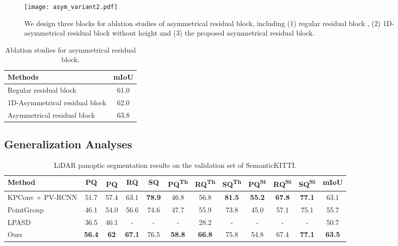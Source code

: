 \documentclass[final]{cvpr}
\newcommand{\PQ}{PQ}
\newcommand{\PQda}{PQ\textsuperscript{}}
\newcommand{\RQ}{RQ}
\newcommand{\SQ}{SQ}
\newcommand{\PQth}{PQ\textsuperscript{Th}}
\newcommand{\RQth}{RQ\textsuperscript{Th}}
\newcommand{\SQth}{SQ\textsuperscript{Th}}
\newcommand{\PQst}{PQ\textsuperscript{St}}
\newcommand{\RQst}{RQ\textsuperscript{St}}
\newcommand{\SQst}{SQ\textsuperscript{St}}
\newcommand{\miou}{mIoU}
\begin{document}
\begin{figure}[t]
    \centering
    \texttt{[image: asym\_variant2.pdf]}
    \caption{We design three blocks for ablation studies of asymmetrical residual block, including (1) regular residual block , (2) 1D-asymmetrical residual block without height and (3) the proposed asymmetrical residual block.}
    \label{fig:asym_vari}
\end{figure}

\begin{table}
\caption{Ablation studies for asymmetrical residual block.}
\centering
\begin{tabular*}{0.75\linewidth}{l|c}
\hline
Methods  & mIoU \\
\hline
\hline
Regular residual block & 61.0\\
\hline
1D-Asymmetrical residual block & 62.0 \\
\hline
Asymmetrical residual block & 63.8 \\
\hline
\end{tabular*}
\label{tab:asym_vari}
\end{table}

\subsection{Generalization Analyses}

\begin{table*}[ht]
\caption{LiDAR panoptic segmentation results on the validation set of SemanticKITTI.}
\vspace{-3ex}
    \begin{center}
    \small{
        \begin{tabular}{l|c|ccc|ccc|ccc|c}
            \hline
            Method & \textbf{\PQ} & \PQda & \RQ & \SQ & \PQth & \RQth & \SQth & \PQst & \RQst & \SQst & \miou \\
            \hline\hline
            KPConv \cite{thomas2019kpconv} +
            PV-RCNN \cite{shi2020pv}              & 51.7         & 57.4          & 63.1          & \textbf{78.9} & 46.8          & 56.8          & \textbf{81.5} & \textbf{55.2} & \textbf{67.8} & \textbf{77.1} & 63.1          \\
            PointGroup \cite{jiang2020pointgroup} & 46.1         & 54.0          & 56.6          & 74.6          & 47.7          & 55.9          & 73.8          & 45.0          & 57.1          & 75.1                      & 55.7          \\
            LPASD \cite{milioto2020iros}             & 36.5 & 46.1 & -    & -    & -    & 28.2 & -    & -    & -    & -    & 50.7 \\
\hline
\hline
            Ours                          & \textbf{56.4} & \textbf{62} & \textbf{67.1} & 76.5          & \textbf{58.8} & \textbf{66.8} & 75.8          & 54.8          & 67.4          & \textbf{77.1} & \textbf{63.5} \\
            \hline
        \end{tabular}
    }
    \end{center}
\label{tab:semkitti_val}
\end{table*}
\end{document}
